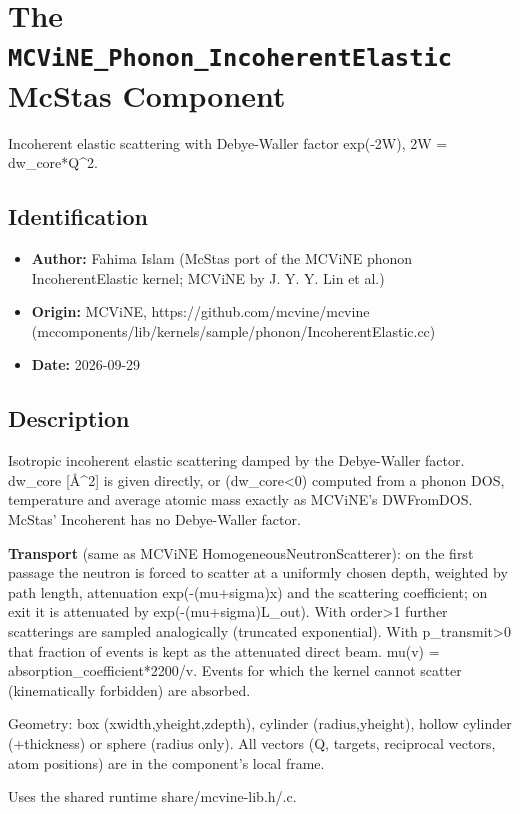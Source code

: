 \section{The \texttt{MCViNE\_Phonon\_IncoherentElastic} McStas Component}
Incoherent elastic scattering with Debye-Waller factor exp(-2W), 2W = dw\_core*Q\textasciicircum{}2.

\subsection*{Identification}
\begin{itemize}
  \item \textbf{Author:} Fahima Islam (McStas port of the MCViNE phonon IncoherentElastic kernel; MCViNE by J. Y. Y. Lin et al.)
  \item \textbf{Origin:} MCViNE, https://github.com/mcvine/mcvine (mccomponents/lib/kernels/sample/phonon/IncoherentElastic.cc)
  \item \textbf{Date:} 2026-09-29
\end{itemize}

\subsection*{Description}
Isotropic incoherent elastic scattering damped by the Debye-Waller factor. dw\_core [\AA{}\textasciicircum{}2] is given directly, or (dw\_core\textless{}0) computed from a phonon DOS, temperature and average atomic mass exactly as MCViNE's DWFromDOS. McStas' Incoherent has no Debye-Waller factor.

\textbf{Transport} (same as MCViNE HomogeneousNeutronScatterer): on the first passage the neutron is forced to scatter at a uniformly chosen depth, weighted by path length, attenuation exp(-(mu+sigma)x) and the scattering coefficient; on exit it is attenuated by exp(-(mu+sigma)L\_out). With order\textgreater{}1 further scatterings are sampled analogically (truncated exponential). With p\_transmit\textgreater{}0 that fraction of events is kept as the attenuated direct beam. mu(v) = absorption\_coefficient*2200/v. Events for which the kernel cannot scatter (kinematically forbidden) are absorbed.

Geometry: box (xwidth,yheight,zdepth), cylinder (radius,yheight), hollow cylinder (+thickness) or sphere (radius only). All vectors (Q, targets, reciprocal vectors, atom positions) are in the component's local frame.

Uses the shared runtime share/mcvine-lib.h/.c.

